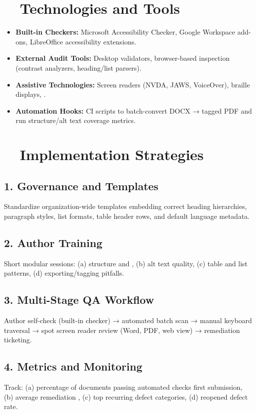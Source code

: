 \section{~~Technologies and Tools}\label{ch20:sec:technologies-tools}
\begin{itemize}
	\item \textbf{Built-in Checkers:} Microsoft Accessibility Checker, Google Workspace add-ons, LibreOffice accessibility extensions.
	\item \textbf{External Audit Tools:} Desktop validators, browser-based inspection (contrast analyzers, heading/list parsers).
	\item \textbf{Assistive Technologies:} Screen readers (NVDA, JAWS, VoiceOver), braille displays,  .
	\item \textbf{Automation Hooks:} CI scripts to batch-convert DOCX → tagged PDF and run structure/alt text coverage metrics.
\end{itemize}

\section{~~Implementation Strategies}\label{ch20:sec:implementation-strategies}
\subsection*{1. Governance and Templates}
Standardize organization-wide templates embedding correct heading hierarchies, paragraph styles, list formats, table header rows, and default language metadata.
\subsection*{2. Author Training}
Short modular sessions: (a) structure and , (b) alt text quality, (c) table and list patterns, (d) exporting/tagging pitfalls.
\subsection*{3. Multi-Stage QA Workflow}
Author self-check (built-in checker) → automated batch scan → manual keyboard traversal → spot screen reader review (Word, PDF, web view) → remediation ticketing.
\subsection*{4. Metrics and Monitoring}
Track: (a) percentage of documents passing automated checks first submission, (b) average remediation , (c) top recurring defect categories, (d) reopened defect rate.

